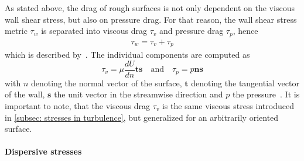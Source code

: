 As stated above, the drag of rough surfaces is not only dependent on the viscous wall shear stress, but also on pressure drag.
For that reason, the wall shear stress metric $\tau_w$ is separated into viscous drag $\tau_v$ and pressure drag $\tau_p$, hence
\begin{eqnarray}\label{eq: drag decomposition}
    \tau_w = \tau_v + \tau_p
\end{eqnarray}
which is described by~\cite{napoliEffectSlopeIrregularly2008}.
The individual components are computed as
\begin{equation}
    \tau_v = \mu\frac{dU}{dn}\mathbf{t} \mathbf{s} \quad \text{and} \quad \tau_p = p\mathbf{n}\mathbf{s}
\end{equation}
with $n$ denoting the normal vector of the surface, $\mathbf{t}$ denoting the tangential vector of the wall, $\mathbf{s}$ the unit vector in the streamwise direction and $p$ the pressure~\citep{napoliEffectSlopeIrregularly2008}.
It is important to note, that the viscous drag $\tau_v$ is the same viscous stress introduced in \autoref{subsec: stresses in turbulence}, but generalized for an arbitrarily oriented surface.

\paragraph{Dispersive stresses}\label{par: dispersive stresses}

